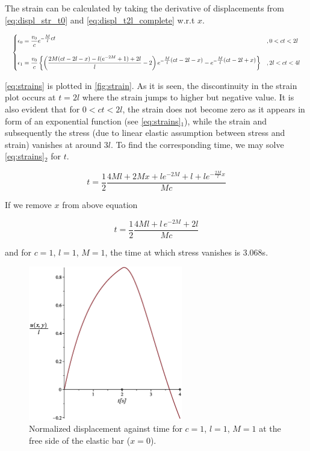 \documentclass{article}
\begin{document}
The strain can be calculated by taking the derivative of displacements from \cref{eq:displ_str_t0} and \cref{eq:displ_t2l_complete} w.r.t $x$.

\begin{equation}\resizebox{1\hsize}{!}{$
    \begin{cases}
        \epsilon_0 = \dfrac{v_0}{c} e^{-\textstyle\frac{M}{l}ct} & , 0<ct<2l \\
        \\
        \epsilon_1 = \dfrac{v_0}{c} \left \{ \left ( \dfrac{2M(ct-2l-x) - l(e^{-2M} + 1) + 2l}{l} -2 \right ) e^{-\textstyle\frac{M}{l}(ct-2l-x)} - e^{-\textstyle\frac{M}{l}(ct-2l+x)} \right \} & , 2l<ct<4l
    \end{cases}$}
    \label{eq:strains}
\end{equation}

\cref{eq:strains} is plotted in \cref{fig:strain}. As it is seen, the discontinuity in the strain plot occurs at $t=2l$ where the strain jumps to higher but negative value. It is also evident that for $0<ct<2l$, the strain does not become zero as it appears in form of an exponential function (see \cref{eq:strains}$_1$), while the strain and subsequently the stress (due to linear elastic assumption between stress and strain) vanishes at around $3l$. To find  the corresponding time, we may solve \cref{eq:strains}$_2$ for $t$.

\begin{equation*}
    t = \dfrac{1}{2} \dfrac{4 M l +2 M x +l e^{-2 M}+l +l e^{-\textstyle\frac{2 M}{l}x}}{M c}
\end{equation*}

If we remove $x$ from above equation

\begin{equation}
    t = \dfrac{1}{2} \dfrac{4 M l +l \,{ e}^{-2 M}+2 l}{M c}
\end{equation}

and for $c = 1$, $ l = 1$,  $M = 1$, the time at which stress vanishes is 3.068s.


\begin{figure}[H]
    \centering
    \includegraphics[width = 0.6\textwidth ]{figures/displ.eps}
    \caption{Normalized displacement against time for $c = 1$, $ l = 1$,  $M = 1$ at the free side of the elastic bar ($x = 0$).}
    \label{fig:displ}
\end{figure}
\end{document}
